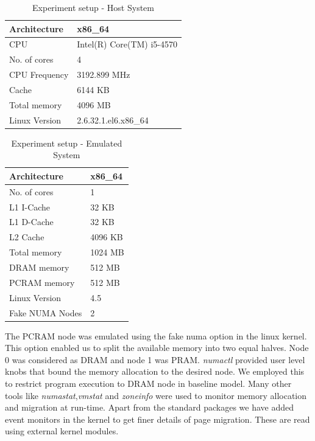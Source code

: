 \documentclass[a4paper, 11pt, conference]{ieeeconf}      %
\begin{document}
\vspace{1mm}

\begin{table}[H]
\def\arraystretch{1.5}
\caption{Experiment setup - Host System}
\label{host_machine}
\begin{center}
\begin{tabular}{|p{2.5cm}||p{4cm}|}
\hline
Architecture & x86\_64\\[0.75ex]
\hline
CPU & Intel(R) Core(TM) i5-4570 \\ [0.75ex]
\hline
No. of cores & 4 \\ [0.75ex]
\hline
CPU Frequency& 3192.899 MHz \\ [0.75ex]
\hline
Cache & 6144 KB \\ [0.75ex]
\hline
Total memory & 4096 MB \\ [0.75ex]
\hline
Linux Version &2.6.32\-573.7.1.el6.x86\_64 \\ [0.75ex]
\hline
\end{tabular}
\end{center}
\end{table}

\begin{table}[H]
\def\arraystretch{1.5}
\caption{Experiment setup - Emulated System}
\label{vm_machine}
\begin{center}
\begin{tabular}{|p{3cm}||p{3.5cm}|}
\hline
Architecture & x86\_64\\[0.75ex]
\hline
No. of cores & 1 \\ [0.75ex]
\hline
L1 I-Cache & 32 KB \\ [0.75ex]
\hline
L1 D-Cache & 32 KB \\ [0.75ex]
\hline
L2 Cache & 4096 KB \\ [0.75ex]
\hline
Total memory & 1024 MB \\ [0.75ex]
\hline
DRAM memory & 512 MB \\ [0.75ex]
\hline
PCRAM memory & 512 MB \\ [0.75ex]
\hline
Linux Version & 4.5 \\ [0.75ex]
\hline
Fake NUMA Nodes & 2 \\ [0.75ex]
\hline
\end{tabular}
\end{center}
\end{table}

\vspace{1mm}

The PCRAM node was emulated using the fake numa option in the linux kernel. This option enabled us to split the available memory into two equal halves. Node 0 was considered as DRAM and node 1 was PRAM. \textit{numactl} provided user level knobs that bound the memory allocation to the desired node. We employed this to restrict program execution to DRAM node in baseline model. Many other tools like \textit{numastat},\textit{vmstat} and \textit{zoneinfo} were used to monitor memory allocation and migration at run-time. Apart from the standard packages we have added event monitors in the kernel to get finer details of page migration. These are read using external kernel modules.
\end{document}
